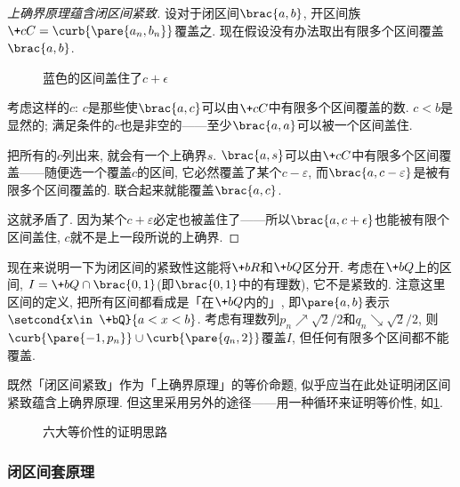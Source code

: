 \documentclass[hidelinks]{ctexart}
\begin{document}
\begin{proof}[上确界原理蕴含闭区间紧致]
    设对于闭区间$\brac{a,b}$, 开区间族$\+cC = \curb{\pare{a_n,b_n}}$覆盖之. 现在假设没有办法取出有限多个区间覆盖$\brac{a,b}$.
    \begin{figure}[h]
        \centering
        \caption{蓝色的区间盖住了$c+\epsilon$}
    \end{figure}
    \par
    考虑这样的$c$: $c$是那些使$\brac{a,c}$可以由$\+cC$中有限多个区间覆盖的数. $c<b$是显然的; 满足条件的$c$也是非空的——至少$\brac{a,a}$可以被一个区间盖住.
    \par
    把所有的$c$列出来, 就会有一个上确界$s$. $\brac{a,s}$可以由$\+cC$中有限多个区间覆盖——随便选一个覆盖$c$的区间, 它必然覆盖了某个$c-\varepsilon$, 而$\brac{a,c-\varepsilon}$是被有限多个区间覆盖的. 联合起来就能覆盖$\brac{a,c}$.
    \par
    这就矛盾了. 因为某个$c+\varepsilon$必定也被盖住了——所以$\brac{a,c+\epsilon}$也能被有限个区间盖住, $c$就不是上一段所说的上确界.
\end{proof}
\begin{sample}
    \begin{ex}
        现在来说明一下为闭区间的紧致性这能将$\+bR$和$\+bQ$区分开. 考虑在$\+bQ$上的区间, $I=\+bQ\cap\brac{0,1}$(即$\brac{0,1}$中的有理数), 它不是紧致的. 注意这里区间的定义, 把所有区间都看成是「在$\+bQ$内的」, 即$\pare{a,b}$表示$\setcond{x\in\+bQ}{a<x<b}$. 考虑有理数列$p_n\nearrow \sqrt{2}/2$和$q_n\searrow \sqrt{2}/2$, 则$\curb{\pare{-1,p_n}}\cup\curb{\pare{q_n,2}}$覆盖$I$, 但任何有限多个区间都不能覆盖.
    \end{ex}
\end{sample}
既然「闭区间紧致」作为「上确界原理」的等价命题, 似乎应当在此处证明闭区间紧致蕴含上确界原理. 但这里采用另外的途径——用一种循环来证明等价性, 如\cref{fig:六大等价性的证明思路}.
\begin{figure}[h]
    \centering
    \centerline{}
    \caption{六大等价性的证明思路}
    \label{fig:六大等价性的证明思路}
\end{figure}


\subsubsection{闭区间套原理} %
\label{ssub:闭区间套原理}
\end{document}
